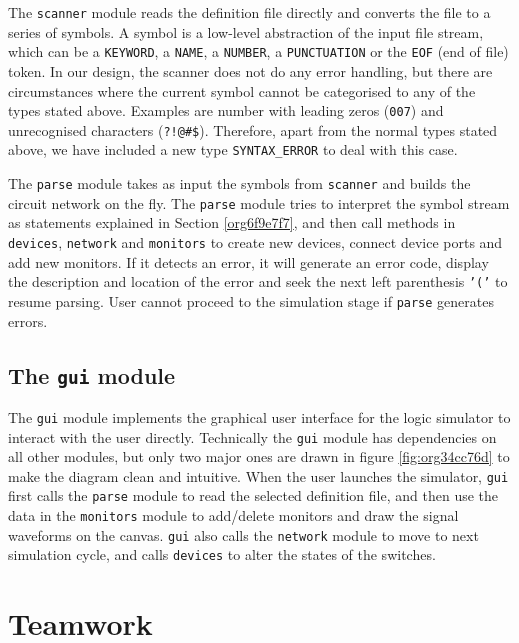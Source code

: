 \documentclass[10pt,a4paper]{article}
\begin{document}
The \texttt{scanner} module reads the definition file directly and converts
the file to a series of symbols. A symbol is a low-level abstraction
of the input file stream, which can be a \texttt{KEYWORD}, a \texttt{NAME}, a
\texttt{NUMBER}, a \texttt{PUNCTUATION} or the \texttt{EOF} (end of file) token. In our
design, the scanner does not do any error handling, but there are
circumstances where the current symbol cannot be categorised to any of
the types stated above. Examples are number with leading zeros (\texttt{007})
and unrecognised characters (\texttt{?!@\#\$}). Therefore, apart from the
normal types stated above, we have included a new type \texttt{SYNTAX\_ERROR}
to deal with this case.

The \texttt{parse} module takes as input the symbols from \texttt{scanner} and builds
the circuit network on the fly. The \texttt{parse} module tries to interpret
the symbol stream as statements explained in Section \ref{org6f9e7f7},
and then call methods in \texttt{devices}, \texttt{network} and \texttt{monitors} to create
new devices, connect device ports and add new monitors. If it detects
an error, it will generate an error code, display the description and
location of the error and seek the next left parenthesis \texttt{'('} to
resume parsing. User cannot proceed to the simulation stage if \texttt{parse}
generates errors.

\subsection{The \texttt{gui} module}
\label{sec:org609724a}

The \texttt{gui} module implements the graphical user interface for the logic
simulator to interact with the user directly. Technically the \texttt{gui}
module has dependencies on all other modules, but only two major ones
are drawn in figure \ref{fig:org34cc76d} to make the diagram clean and
intuitive. When the user launches the simulator, \texttt{gui} first calls the
\texttt{parse} module to read the selected definition file, and then use the
data in the \texttt{monitors} module to add/delete monitors and draw the
signal waveforms on the canvas. \texttt{gui} also calls the \texttt{network} module
to move to next simulation cycle, and calls \texttt{devices} to alter the
states of the switches.

\section{Teamwork}
\label{sec:org2d66642}
\end{document}
